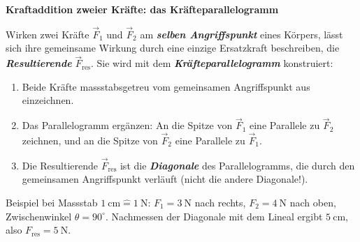 \documentclass[addpoints,11pt,a4paper]{exam}
\newenvironment{theoriebox}[1][Theorie]{%
  \par\addvspace{10pt}\noindent\textbf{#1}\par\smallskip\noindent
}{%
  \par\addvspace{10pt}
}
\newcommand{\Feinraster}[4]{%
  \draw[gray!22,step=0.5] (#1,#2) grid (#3,#4);
  \draw[gray!55,step=1] (#1,#2) grid (#3,#4);
}
\newcommand{\Massstab}[2]{\SI{#1}{\centi\meter}\mathrel{\hat=}\SI{#2}{\newton}}
\begin{document}
\begin{theoriebox}[Kraftaddition zweier Kräfte: das Kräfteparallelogramm]
Wirken zwei Kräfte $\vec F_1$ und $\vec F_2$ am \textbf{\emph{selben
Angriffspunkt}} eines Körpers, lässt sich ihre gemeinsame Wirkung durch eine
einzige Ersatzkraft beschreiben, die \textbf{\emph{Resultierende}}
$\vec F_{\text{res}}$. Sie wird mit dem \textbf{\emph{Kräfteparallelogramm}}
konstruiert:

\begin{enumerate}[leftmargin=1.2cm,itemsep=0.2em]
  \item Beide Kräfte massstabsgetreu vom gemeinsamen Angriffspunkt aus
  einzeichnen.
  \item Das Parallelogramm ergänzen: An die Spitze von $\vec F_1$ eine Parallele
  zu $\vec F_2$ zeichnen, und an die Spitze von $\vec F_2$ eine Parallele zu
  $\vec F_1$.
  \item Die Resultierende $\vec F_{\text{res}}$ ist die \textbf{\emph{Diagonale}}
  des Parallelogramms, die durch den gemeinsamen Angriffspunkt verläuft (nicht
  die andere Diagonale!).
\end{enumerate}

\begin{center}
\end{center}
{\scriptsize Beispiel bei Massstab $\Massstab{1}{1}$: $F_1=\SI{3}{\newton}$
nach rechts, $F_2=\SI{4}{\newton}$ nach oben, Zwischenwinkel $\theta=90^\circ$.
Nachmessen der Diagonale mit dem Lineal ergibt $\SI{5}{\centi\meter}$, also
$F_{\text{res}}=\SI{5}{\newton}$.}
\end{theoriebox}
\end{document}
